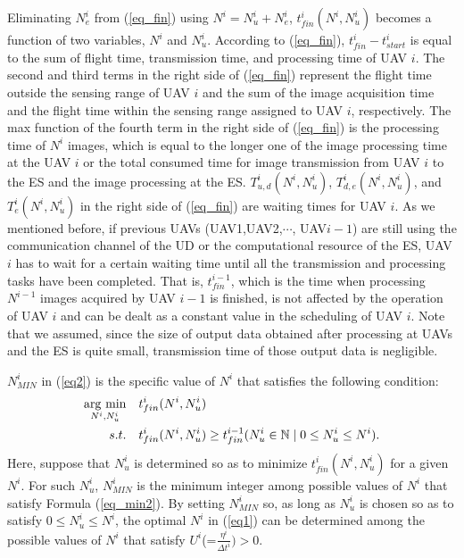 \documentclass{ieeeaccess}
\newcommand{\argmin}{\mathop{\rm arg~min}\limits}
\begin{document}
Eliminating $N_e^i$ from (\ref{eq_fin}) using $N^i=N_u^i+N_e^i$, $t_{fin}^i(N^i,N_u^i)$ becomes a function of two variables, $N^i$ and $N_u^i$.
%
According to (\ref{eq_fin}), $t_{fin}^i-t_{start}^i$ is equal to the sum of flight time, transmission time, and processing time of UAV $i$.
%
The second and third terms in the right side of (\ref{eq_fin}) represent the flight time outside the sensing range of UAV $i$ and the sum of the image acquisition time and the flight time within the sensing range assigned to UAV $i$, respectively.
%
The max function of the fourth term in the right side of (\ref{eq_fin}) is the processing time of $N^i$ images, which is equal to the longer one of the image processing time at the UAV $i$ or the total consumed time for image transmission from UAV $i$ to the ES and the image processing at the ES.
%
$T_{u,d}^{i}(N^i,N_u^i)$, $T_{d,e}^{i}(N^i,N_u^i)$, and $T_e^{i}(N^i,N_u^i)$ in the right side of (\ref{eq_fin}) are waiting times for UAV $i$.
%
As we mentioned before, if previous UAVs (UAV1,UAV2,$\cdots$, UAV${i-1}$) are still using the communication channel of the UD or the computational resource of the ES, UAV $i$ has to wait for a certain waiting time until all the transmission and processing tasks have been completed.
%
That is, $t_{fin}^{i-1}$, which is the time when processing $N^{i-1}$ images acquired by UAV $i-1$ is finished, is not affected by the operation of UAV $i$ and can be dealt as a constant value in the scheduling of UAV $i$.
%
Note that we assumed, since the size of output data obtained after processing at UAVs and the ES is quite small, transmission time of those output data is negligible.

$N_{MIN}^i$ in (\ref{eq2}) is the specific value of $N^i$ that satisfies the following condition:
%
\begin{align}
\argmin_{N^i,N_u^i} \quad& {t_{fin}^i(N^i,N_u^i)}\label{eq_min1}\\
s.t. \quad& {t_{fin}^i(N^i,N_u^i)}\geq{t_{fin}^{i-1}}({N_u^i}\in \mathbb{N}\mid 0\leq{N_u^i}\leq{N^i}). \label{eq_min2}
\end{align}
%
Here, suppose that ${N_u^i}$ is determined so as to minimize $t_{fin}^i(N^i,N_u^i)$ for a given $N^i$.
%
For such ${N_u^i}$, $N_{MIN}^i$ is the minimum integer among possible values of $N^i$ that satisfy Formula (\ref{eq_min2}).
%
By setting $N_{MIN}^i$ so, as long as ${N_u^i}$ is chosen so as to satisfy $0\leq{N_u^i}\leq{N^i}$, the optimal $N^i$ in (\ref{eq1}) can be determined among the possible values of $N^i$ that satisfy $U^i$(=$\frac{\eta^{i}}{{\Delta{t}}^i}) > 0$.
\end{document}
